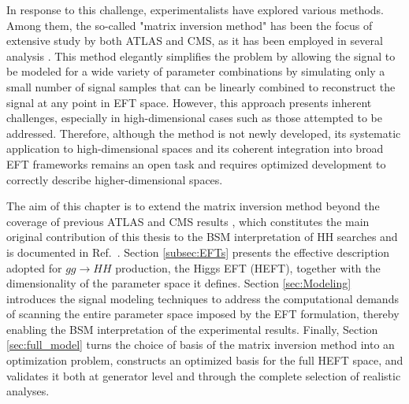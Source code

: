 In response to this challenge, experimentalists have explored various methods. Among them, the so-called "matrix inversion method" has been the focus of extensive study by both ATLAS and CMS, as it has been employed in several analysis \cite{ATLAS-HH-bbtautau-Run2,CMS_combination}. This method elegantly simplifies the problem by allowing the signal to be modeled for a wide variety of parameter combinations by simulating only a small number of signal samples that can be linearly combined to reconstruct the signal at any point in EFT space. However, this approach presents inherent challenges, especially in high-dimensional cases such as those attempted to be addressed. Therefore, although the method is not newly developed, its systematic application to high-dimensional spaces and its coherent integration into broad EFT frameworks remains an open task and requires optimized development to correctly describe higher-dimensional spaces.


The aim of this chapter is to extend the matrix inversion method beyond the coverage of previous ATLAS and CMS results \cite{ATLAS:2025tkn,CMS_combination}, which constitutes the main original contribution of this thesis to the BSM interpretation of HH searches and is documented in Ref.~\cite{LHCHWG-2026-015}. Section \ref{subsec:EFTs} presents the effective description adopted for $gg\to HH$ production, the Higgs EFT (HEFT), together with the dimensionality of the parameter space it defines. Section \ref{sec:Modeling} introduces the signal modeling techniques to address the computational demands of scanning the entire parameter space imposed by the EFT formulation, thereby enabling the BSM interpretation of the experimental results. Finally, Section \ref{sec:full_model} turns the choice of basis of the matrix inversion method into an optimization problem, constructs an optimized basis for the full HEFT space, and validates it both at generator level and through the complete selection of realistic analyses.




